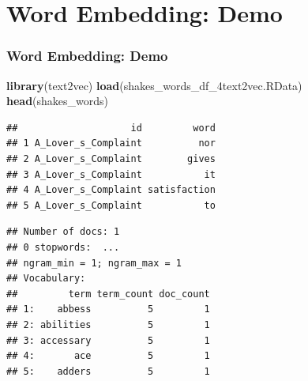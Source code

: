 \documentclass[
  shownotes,
  xcolor={svgnames},
  hyperref={colorlinks,citecolor=DarkBlue,linkcolor=DarkRed,urlcolor=DarkBlue}
  , aspectratio=169]{beamer}
\newenvironment{Shaded}{\begin{snugshade}}{\end{snugshade}}
\newcommand{\DataTypeTok}[1]{\textcolor[rgb]{0.13,0.29,0.53}{#1}}
\newcommand{\DecValTok}[1]{\textcolor[rgb]{0.00,0.00,0.81}{#1}}
\newcommand{\KeywordTok}[1]{\textcolor[rgb]{0.13,0.29,0.53}{\textbf{#1}}}
\newcommand{\NormalTok}[1]{#1}
\newcommand{\OperatorTok}[1]{\textcolor[rgb]{0.81,0.36,0.00}{\textbf{#1}}}
\newcommand{\OtherTok}[1]{\textcolor[rgb]{0.56,0.35,0.01}{#1}}
\newcommand{\StringTok}[1]{\textcolor[rgb]{0.31,0.60,0.02}{#1}}
\begin{document}
\section{Word Embedding: Demo }
\begin{frame}[fragile]
\frametitle{Word Embedding: Demo }


\begin{scriptsize}

\begin{Shaded}
\begin{Highlighting}[]
\KeywordTok{library}\NormalTok{(text2vec)}
\KeywordTok{load}\NormalTok{(}\StringTok{\textquotesingle{}shakes\_words\_df\_4text2vec.RData\textquotesingle{}}\NormalTok{)}
\KeywordTok{head}\NormalTok{(shakes\_words)}
\end{Highlighting}
\end{Shaded}

\end{scriptsize}
\begin{tiny}


\begin{verbatim}
##                    id         word
## 1 A_Lover_s_Complaint          nor
## 2 A_Lover_s_Complaint        gives
## 3 A_Lover_s_Complaint           it
## 4 A_Lover_s_Complaint satisfaction
## 5 A_Lover_s_Complaint           to
\end{verbatim}
\end{tiny}

\begin{scriptsize}

\begin{Shaded}
\end{Shaded}

\end{scriptsize}
\begin{tiny}


\begin{verbatim}
## Number of docs: 1 
## 0 stopwords:  ... 
## ngram_min = 1; ngram_max = 1 
## Vocabulary: 
##         term term_count doc_count
## 1:    abbess          5         1
## 2: abilities          5         1
## 3: accessary          5         1
## 4:       ace          5         1
## 5:    adders          5         1
\end{verbatim}
\end{tiny}

\end{frame}
\end{document}
